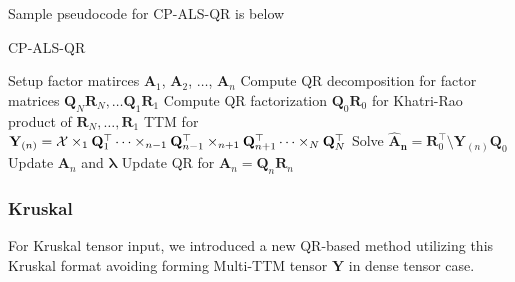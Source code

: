 \documentclass{article}
\newcommand{\mat}[1]{\mathbf{#1}}
\newcommand{\M}[2][]{\bm{#1{\mathbf{\MakeUppercase{#2}}}}} 		%
\newcommand{\T}[2][]{#1{\mathbf{\cal{#2}}}} 						%
\begin{document}
Sample pseudocode for CP-ALS-QR is below
\begin{algorithm}
  \caption{CP-ALS-QR}
  \label{alg:cp-als-qr}
  \begin{algorithmic}[1]
    \Function{$[\bm{\lambda},\M{A}_{n}]=$ CP-ALS}{$\T{X},R$}
      \State Setup factor matirces  $\mat{A}_1$, $\mat{A}_2$, $\dots$, $\mat{A}_n$
      \State Compute QR decomposition for factor matrices $\mat{Q}_N\mat{R}_N, \dots \mat{Q}_1\mat{R}_1$
      \State Compute QR factorization $\mat{Q}_0\mat{R}_0$ for Khatri-Rao product of $\mat{R}_N, \dots, \mat{R}_1$
      \State TTM for $\mat{Y}_{(n)} =  \T{X} \times_1 \mat{Q}_1^\top \dots \times_{n-1} \mat{Q}_{n-1}^\top \times_{n+1} \mat{Q}_{n+1}^\top \dots \times_N \mat{Q}_N^\top$
      \State Solve $\mat{\hat{A}_n} = \mat{R}_0^\top \text{\textbackslash} \mat{Y}_{(n)} \mat{Q}_0$
      \State Update $\mat{A}_n$ and $\bm{\lambda}$
      \State Update QR for $\mat{A}_n = \mat{Q}_n\mat{R}_n$      
      \EndFor
      \EndWhile
    \EndFunction
  \end{algorithmic}
\end{algorithm}



\subsubsection*{Kruskal}
For Kruskal tensor input, we introduced a new QR-based method utilizing this Kruskal format avoiding
forming Multi-TTM tensor $\mat{Y}$ in dense tensor case.
\end{document}
